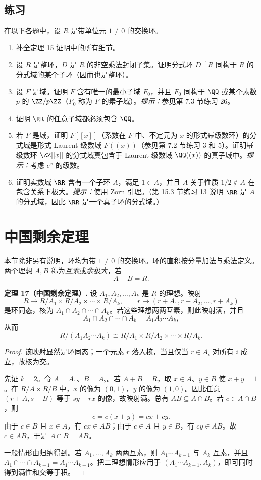 \subsection*{练习}
在以下各题中，设 $R$ 是带单位元 $1\neq0$ 的交换环。
\begin{enumerate}[label=\arabic*.]
	\item 补全定理 15 证明中的所有细节。
	\item 设 $R$ 是整环，$D$ 是 $R$ 的非空乘法封闭子集。证明分式环 $D^{-1}R$ 同构于 $R$ 的分式域的某个子环（因而也是整环）。
	\item 设 $F$ 是域。证明 $F$ 含有唯一的最小子域 $F_0$，并且 $F_0$ 同构于 $\QQ$ 或某个素数 $p$ 的 $\ZZ/p\ZZ$（$F_0$ 称为 $F$ 的素子域）。\emph{提示：}参见第 7.3 节练习 26。
	\item 证明 $\RR$ 的任意子域都必须包含 $\QQ$。
	\item 若 $F$ 是域，证明 $F[[x]]$（系数在 $F$ 中、不定元为 $x$ 的形式幂级数环）的分式域是形式 Laurent 级数域 $F((x))$（参见第 7.2 节练习 3 和 5）。证明幂级数环 $\ZZ[[x]]$ 的分式域真包含于 Laurent 级数域 $\QQ((x))$ 的真子域中。\emph{提示：}考虑 $e^x$ 的级数。
	\item 证明实数域 $\RR$ 含有一个子环 $A$，满足 $1\in A$，并且 $A$ 关于性质 $1/2\notin A$ 在包含关系下极大。\emph{提示：}使用 Zorn 引理。（第 15.3 节练习 13 说明 $\RR$ 是 $A$ 的分式域，因此 $\RR$ 是一个真子环的分式域。）
\end{enumerate}



\section{中国剩余定理}

本节除非另有说明，环均为带 $1\neq0$ 的交换环。环的直积按分量加法与乘法定义。两个理想 $A,B$ 称为\emph{互素}或\emph{余极大}，若
\[
  A+B=R.
\]

\medskip
\noindent\textbf{定理 17（中国剩余定理）.} 设 $A_1,A_2,\ldots,A_k$ 是 $R$ 的理想。映射
\[
  R\longrightarrow R/A_1\times R/A_2\times\cdots\times R/A_k,
  \qquad r\longmapsto(r+A_1,r+A_2,\ldots,r+A_k)
\]
是环同态，核为 $A_1\cap A_2\cap\cdots\cap A_k$。若这些理想两两互素，则此映射满，并且
\[
  A_1\cap A_2\cap\cdots\cap A_k=A_1A_2\cdots A_k,
\]
从而
\[
  R/(A_1A_2\cdots A_k)
  \cong R/A_1\times R/A_2\times\cdots\times R/A_k.
\]

\begin{proof}
该映射显然是环同态；一个元素 $r$ 落入核，当且仅当 $r\in A_i$ 对所有 $i$ 成立，故核为交。

先证 $k=2$。令 $A=A_1$、$B=A_2$。若 $A+B=R$，取 $x\in A$、$y\in B$ 使 $x+y=1$。在 $R/A\times R/B$ 中，$x$ 的像为 $(0,1)$，$y$ 的像为 $(1,0)$。因此任意 $(r+A,s+B)$ 等于 $sy+rx$ 的像，故映射满。总有 $AB\subseteq A\cap B$。若 $c\in A\cap B$，则
\[
  c=c(x+y)=cx+cy.
\]
由于 $c\in B$ 且 $x\in A$，有 $cx\in AB$；由于 $c\in A$ 且 $y\in B$，有 $cy\in AB$。故 $c\in AB$，于是 $A\cap B=AB$。

一般情形由归纳得到。若 $A_1,
\ldots,A_k$ 两两互素，则 $A_1\cdots A_{k-1}$ 与 $A_k$ 互素，并且 $A_1\cap\cdots\cap A_{k-1}=A_1\cdots A_{k-1}$。把二理想情形应用于 $(A_1\cdots A_{k-1},A_k)$，即可同时得到满性和交等于积。
\end{proof}


